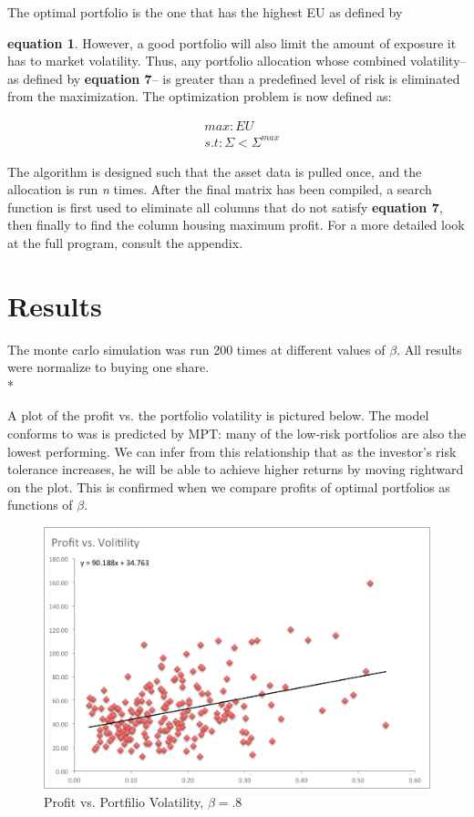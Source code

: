 \documentclass[12pt]{article}
\begin{document}
\* The optimal portfolio is the one that has the highest EU as defined by {{\bf equation 1}. 
\* However, a good portfolio will also limit the amount of exposure it has to market volatility. Thus, any portfolio allocation whose combined volatility--as defined by {\bf equation 7}-- is greater than a predefined level of risk is eliminated from the maximization. The optimization problem is now defined as:

\begin{equation}
	\begin{split} 
		& max: EU \\ 
		& s.t: \Sigma < \Sigma^{max}
	\end{split}
\end{equation}

The algorithm is designed such that the asset data is pulled once, and the allocation is run \emph{n} times. After the final matrix has been compiled, a search function is first used to eliminate all columns that do not satisfy {\bf equation 7}, then finally to find the column housing maximum profit. For a more detailed look at the full program, consult the appendix. 

\section{Results}
The monte carlo simulation was run 200 times at different values of $\beta$. All results were normalize to buying one share. \\*

A plot of the profit vs. the portfolio volatility is pictured below. The model conforms to was is predicted by MPT: many of the low-risk portfolios are also the lowest performing. We can infer from this relationship that as the investor's risk tolerance increases, he will be able to achieve higher returns by moving rightward on the plot. This is confirmed when we compare profits of optimal portfolios as functions of $\beta$. 

\begin{figure}[H]
\begin{center}
\includegraphics[scale=.6]{Figures/Profit_v_Volit.png}
\caption{Profit vs. Portfilio Volatility, $\beta = .8$}
\end{center}
\end{figure}

}
\end{document}
